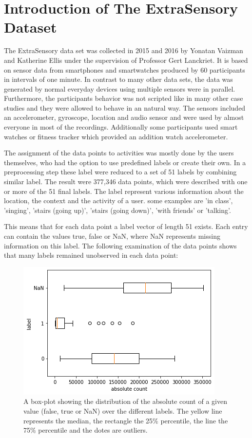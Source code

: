 \section{Introduction of The ExtraSensory Dataset}

The ExtraSensory data set was collected in 2015 and 2016 by Yonatan Vaizman and Katherine Ellis under the supervision of Professor Gert Lanckriet. It is based on sensor data from smartphones and smartwatches produced by 60 participants in intervals of one minute. In contrast to many other data sets, the data was generated by normal everyday devices using multiple sensors were in parallel. Furthermore, the participants behavior was not scripted like in many other case studies and they were allowed to behave in an natural way. The sensors included an accelerometer, gyroscope, location and audio sensor and were used by almost everyone in most of the recordings. Additionally some participants used smart watches or fitness tracker which provided an addition watch accelerometer.

The assignment of the data points to activities was mostly done by the users themselves, who had the option to use predefined labels or create their own. In a preprocessing step these label were reduced to a set of 51 labels by combining similar label. The result were 377,346 data points, which were described with one or more of the 51 final labels. The label represent various information about the location, the context and the activity of a user. some examples are 'in class', 'singing', 'stairs (going up)', 'stairs (going down)', 'with friends' or 'talking'.

This means that for each data point a label vector of length 51 exists. Each entry can contain the values true, false or NaN, where NaN represents missing information on this label. The following examination of the data points shows that many labels remained unobserved in each data point:

\begin{figure}[H]
	\begin{center}
		\includegraphics[scale=.8]{images/boxplot_label.png}
		\caption{A box-plot showing the distribution of the absolute count of a given value (false, true or NaN) over the different labels. The yellow line represents the median, the rectangle the 25\% percentile, the line the 75\% percentile and the dotes are outliers.}
		\label{abb:boxplot_label}
	\end{center}		
\end{figure}	

